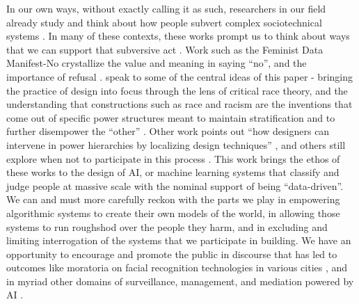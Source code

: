 \documentclass[manuscript,screen]{acmart}
\begin{document}
In our own ways, without exactly calling it as such, researchers in our field already study and think about how people subvert complex sociotechnical systems
\cite{uberAlgorithm,10.1145/3313831.3376424}.
In many of these contexts, these works prompt us to think about ways that we can support that subversive act
\cite{doi:10.1177/2053951717718855}.
Work such as the Feminist Data Manifest-No crystallize the value and meaning in saying ``no'', and the importance of refusal
\cite{feministManifestNo}.
\citeauthor{10.1145/3313831.3376392} speak to some of the central ideas of this paper -
bringing the practice of design into focus through the lens of critical race theory, and the understanding that constructions such as race and racism are the inventions that come out of specific power structures meant to maintain stratification and to further disempower the ``other''
\cite{10.1145/3313831.3376392}.
Other work points out ``how designers can intervene in power hierarchies by localizing design techniques''
\cite{10.1145/3290605.3300791}, and others still explore when not to participate in this process
\cite{10.1145/1978942.1979275}.
This work brings the ethos of these works to the design of AI, or machine learning systems that classify and judge people at massive scale with the nominal support of being ``data-driven''.
We can and must more carefully reckon with the parts we play in empowering algorithmic systems to create their own models of the world, in allowing those systems to run roughshod over the people they harm, and in excluding and limiting interrogation of the systems that we participate in building.
We have an opportunity to encourage and promote the public in discourse that has led to outcomes like moratoria on facial recognition technologies in various cities \cite{10.1145/3313129}, and in myriad other domains of surveillance, management, and mediation powered by AI \cite{mattern2017city}.
\end{document}

